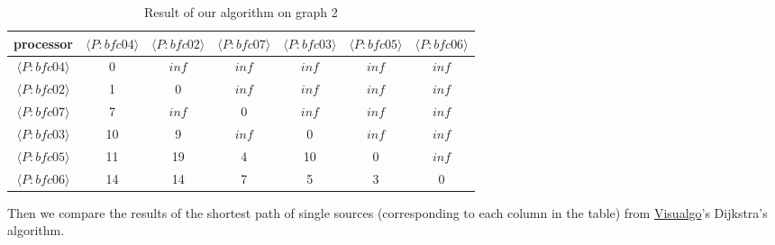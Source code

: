 \documentclass[11pt]{article}  %
\begin{document}
\begin{table}[!htbp]
\centering
\setlength{\tabcolsep}{1mm}
\begin{tabular}{|c|c|c|c|c|c|c|}
\hline
processor&$\langle P:bfc04 \rangle$&$\langle P:bfc02\rangle$&$\langle P:bfc07\rangle$&$\langle P:bfc03\rangle$&$\langle P:bfc05\rangle$&$\langle P:bfc06\rangle$\\
\hline
$\langle P:bfc04\rangle$&0&$inf$&$inf$&$inf$&$inf$&$inf$\\
\hline
$\langle P:bfc02\rangle$&1&0&$inf$&$inf$&$inf$&$inf$\\
\hline
$\langle P:bfc07\rangle$&7&$inf$&0&$inf$&$inf$&$inf$\\
\hline
$\langle P:bfc03\rangle$&10&9&$inf$&0&$inf$&$inf$\\
\hline
$\langle P:bfc05\rangle$&11&19&4&10&0&$inf$\\
\hline
$\langle P:bfc06\rangle$&14&14&7&5&3&0\\
\hline
\end{tabular}
\caption{Result of our algorithm on graph 2}
\end{table}\par

Then we compare the results of the shortest path of single sources (corresponding to each column in the table) from \href{https://visualgo.net/en/sssp}{Visualgo}'s Dijkstra's algorithm.\par
\end{document}
